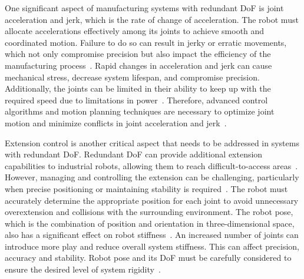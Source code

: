 






One significant aspect of manufacturing systems with redundant DoF is joint acceleration and jerk, which is the rate of change of acceleration. The robot must allocate accelerations effectively among its joints to achieve smooth and coordinated motion. Failure to do so can result in jerky or erratic movements, which not only compromise precision but also impact the efficiency of the manufacturing process~\cite{Duong.2021}. Rapid changes in acceleration and jerk can cause mechanical stress, decrease system lifespan, and compromise precision. Additionally, the joints can be limited in their ability to keep up with the required speed due to limitations in power~\cite{Staff.1988}. Therefore, advanced control algorithms and motion planning techniques are necessary to optimize joint motion and minimize conflicts in joint acceleration and jerk~\cite{Duong.2021, Valente.2017}.

Extension control is another critical aspect that needs to be addressed in systems with redundant DoF. Redundant DoF can provide additional extension capabilities to industrial robots, allowing them to reach difficult-to-access areas~\cite{Duong.2021}. However, managing and controlling the extension can be challenging, particularly when precise positioning or maintaining stability is required~\cite{Lin.2022}.
The robot must accurately determine the appropriate position for each joint to avoid unnecessary overextension and collisions with the surrounding environment. The robot pose, which is the combination of position and orientation in three-dimensional space, also has a significant effect on robot stiffness~\cite{Xiong.2019}. An increased number of joints can introduce more play and reduce overall system stiffness. This can affect precision, accuracy and stability. Robot pose and its DoF must be carefully considered to ensure the desired level of system rigidity~\cite{Liu.2022, Shi.2021}.


